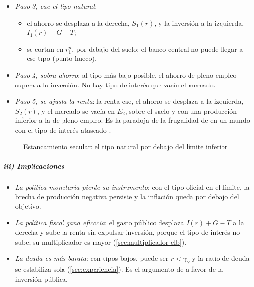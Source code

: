 \documentclass[11pt]{article}
\begin{document}
\begin{itemize}
\begin{itemize}
  \item \emph{Paso 3, cae el tipo natural}:
    \begin{itemize}
    \item el ahorro se desplaza a la derecha, $S_1(r)$, y la inversión a la izquierda, $I_1(r)+G-T$;
    \item se cortan en $r^n_1$, por debajo del suelo: el banco central no puede llegar a ese tipo (punto hueco).
    \end{itemize}
  \item \emph{Paso 4, sobra ahorro}: al tipo más bajo posible, el ahorro de pleno empleo supera a la inversión. No hay tipo de interés que vacíe el mercado.
  \item \emph{Paso 5, se ajusta la renta}: la renta cae, el ahorro se desplaza a la izquierda, $S_2(r)$, y el mercado se vacía en $E_2$, sobre el suelo y con una producción inferior a la de pleno empleo. Es la paradoja de la frugalidad de  en un mundo con el tipo de interés atascado .
  \end{itemize}
\end{itemize}

\begin{figure}[H]
\centering
\caption{Estancamiento secular: el tipo natural por debajo del límite inferior}\label{fig:estancamiento-secular}
\end{figure}

\subparagraph{iii) Implicaciones}

\begin{itemize}
\item \emph{La política monetaria pierde su instrumento}: con el tipo oficial en el límite, la brecha de producción negativa persiste y la inflación queda por debajo del objetivo.
\item \emph{La política fiscal gana eficacia}: el gasto público desplaza $I(r)+G-T$ a la derecha y sube la renta sin expulsar inversión, porque el tipo de interés no sube; su multiplicador es mayor (\ref{sec:multiplicador-elb}).
\item \emph{La deuda es más barata}: con tipos bajos, puede ser $r<\gamma_Y$ y la ratio de deuda se estabiliza sola (\ref{sec:experiencia}). Es el argumento de  a favor de la inversión pública.
\end{itemize}
\end{document}

